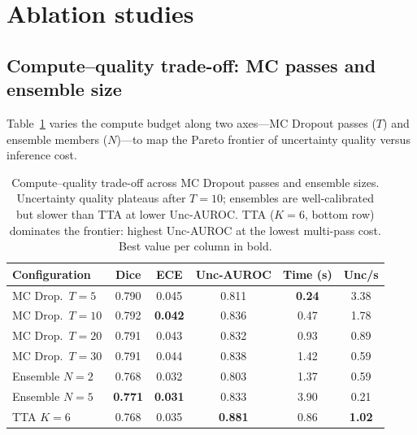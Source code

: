 \section{Ablation studies}
\label{sec:ablations}

\subsection{Compute--quality trade-off: MC passes and ensemble size}

Table~\ref{tab:compute_quality} varies the compute budget along two axes---MC
Dropout passes ($T$) and ensemble members ($N$)---to map the Pareto frontier
of uncertainty quality versus inference cost.

\begin{table}[H]
\centering
\caption{Compute--quality trade-off across MC Dropout passes and ensemble
sizes. Uncertainty quality plateaus after $T{=}10$; ensembles are
well-calibrated but slower than TTA at lower Unc-AUROC. TTA ($K{=}6$,
bottom row) dominates the frontier: highest Unc-AUROC at the lowest
multi-pass cost. Best value per column in bold.}
\label{tab:compute_quality}
\scriptsize
\setlength{\tabcolsep}{4pt}
\renewcommand{\arraystretch}{1.05}
\begin{center}
\begin{tabular}{l c c c c c}
\toprule
\textbf{Configuration} & \textbf{Dice} & \textbf{ECE} & \textbf{Unc-AUROC} &
\textbf{Time (s)} & \textbf{Unc/s} \\
\midrule
MC Drop.\ $T{=}5$   & 0.790 & 0.045 & 0.811 & \textbf{0.24} & 3.38 \\
MC Drop.\ $T{=}10$  & 0.792 & \textbf{0.042} & 0.836 & 0.47 & 1.78 \\
MC Drop.\ $T{=}20$  & 0.791 & 0.043 & 0.832 & 0.93 & 0.89 \\
MC Drop.\ $T{=}30$  & 0.791 & 0.044 & 0.838 & 1.42 & 0.59 \\
\addlinespace[2pt]
\midrule
\addlinespace[2pt]
Ensemble $N{=}2$     & 0.768 & 0.032 & 0.803 & 1.37 & 0.59 \\
Ensemble $N{=}5$     & \textbf{0.771} & \textbf{0.031} & 0.833 & 3.90 & 0.21 \\
\addlinespace[2pt]
\midrule
\addlinespace[2pt]
TTA $K{=}6$          & 0.768 & 0.035 & \textbf{0.881} & 0.86 & \textbf{1.02} \\
\bottomrule
\end{tabular}
\end{center}
\end{table}

